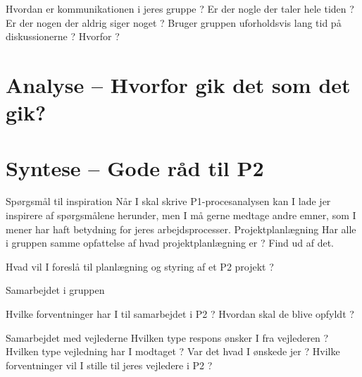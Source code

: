\documentclass[oneside,a4paper,titlepage]{article}
\begin{document}
Hvordan er kommunikationen i jeres gruppe ? Er der nogle der taler hele tiden ? Er der nogen der aldrig siger noget ? Bruger gruppen uforholdsvis lang tid på diskussionerne ? Hvorfor ?


\section{Analyse – Hvorfor gik det som det gik?}

\section{Syntese – Gode råd til P2}



Spørgsmål til inspiration
Når I skal skrive P1-procesanalysen kan I lade jer inspirere af spørgsmålene herunder, men I må
gerne medtage andre emner, som I mener har haft betydning for jeres arbejdsprocesser.
Projektplanlægning
Har alle i gruppen samme opfattelse af hvad projektplanlægning er ? Find ud af det.

Hvad vil I foreslå til planlægning og styring af et P2 projekt ?

Samarbejdet i gruppen

Hvilke forventninger har I til samarbejdet i P2 ? Hvordan skal de blive opfyldt ?

Samarbejdet med vejlederne
Hvilken type respons ønsker I fra vejlederen ?
Hvilken type vejledning har I modtaget ? Var det hvad I ønskede jer ?
Hvilke forventninger vil I stille til jeres vejledere i P2 ?
\end{document}
